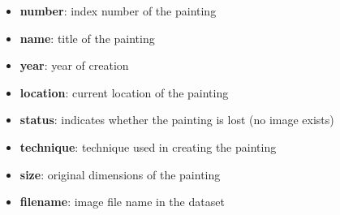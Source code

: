 \documentclass[a4paper,12pt]{article}
\begin{document}
\begin{itemize}
      \item \textbf{number}: index number of the painting
      \item \textbf{name}: title of the painting
      \item \textbf{year}: year of creation
      \item \textbf{location}: current location of the painting
      \item \textbf{status}: indicates whether the painting is lost (no image exists)
      \item \textbf{technique}: technique used in creating the painting
      \item \textbf{size}: original dimensions of the painting
      \item \textbf{filename}: image file name in the dataset
\end{itemize}
\end{document}
